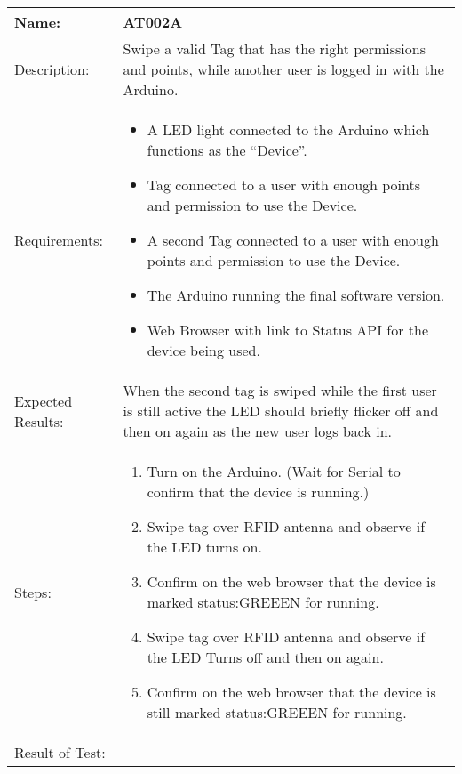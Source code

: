 \begin{table}[h]
	\centering
		\begin{tabular*}{\textwidth}{|l|l|}
		\hline
		\hline
		Name: & AT002A\\
		\hline
		Description: & Swipe a valid Tag that has the right permissions and points, while another user is logged in with the Arduino.\\
		\hline
		Requirements: & \parbox{0.85\textwidth}{
		\begin{itemize}
		  \item A LED light connected to the Arduino which functions as the ``Device''.
			\item Tag connected to a user with enough points and permission to use the Device.
			\item A second Tag connected to a user with enough points and permission to use the Device.
			\item The Arduino running the final software version.
			\item Web Browser with link to Status API for the device being used.
		\end{itemize}}
		\\
		\hline
		Expected Results: & \parbox{.85\textwidth}{When the second tag is swiped while the first user is still active the LED should briefly flicker off and then on again as the new user logs back in.}\\
		\hline
		Steps: & \parbox{.85\textwidth}{
		\begin{enumerate}
			\item Turn on the Arduino. (Wait for Serial to confirm that the device is running.)
			\item Swipe tag over RFID antenna and observe if the LED turns on.
			\item Confirm on the web browser that the device is marked status:GREEEN for running.
			\item Swipe tag over RFID antenna and observe if the LED Turns off and then on again.
			\item Confirm on the web browser that the device is still marked status:GREEEN for running.
		\end{enumerate}}
		\\
		\hline
		Result of Test: & \\
		\end{tabular*}
\end{table}
